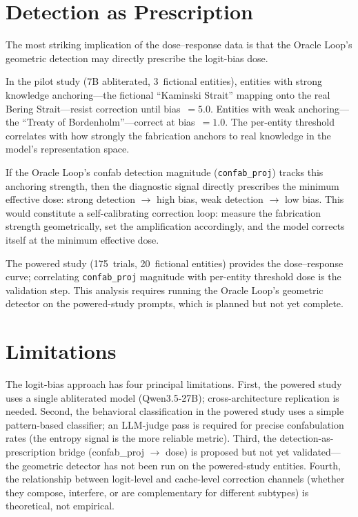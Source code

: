 \documentclass[11pt,a4paper]{article}
\begin{document}
\section{Detection as Prescription}
\label{sec:prescription}

The most striking implication of the dose--response data is that the Oracle
Loop's geometric detection may directly prescribe the logit-bias dose.

In the pilot study (7B abliterated, 3~fictional entities), entities with
strong knowledge anchoring---the fictional ``Kaminski Strait'' mapping onto the
real Bering Strait---resist correction until bias~$= 5.0$. Entities with weak
anchoring---the ``Treaty of Bordenholm''---correct at bias~$= 1.0$. The
per-entity threshold correlates with how strongly the fabrication anchors to
real knowledge in the model's representation space.

If the Oracle Loop's confab detection magnitude (\texttt{confab\_proj}) tracks
this anchoring strength, then the diagnostic signal directly prescribes the
minimum effective dose: strong detection $\to$ high bias, weak detection $\to$
low bias. This would constitute a self-calibrating correction loop: measure
the fabrication strength geometrically, set the amplification accordingly, and
the model corrects itself at the minimum effective dose.

The powered study (175~trials, 20~fictional entities) provides the
dose--response curve; correlating \texttt{confab\_proj} magnitude with
per-entity threshold dose is the validation step. This analysis requires
running the Oracle Loop's geometric detector on the powered-study prompts,
which is planned but not yet complete.

\section{Limitations}
\label{sec:limitations}

The logit-bias approach has four principal limitations. First, the powered
study uses a single abliterated model (Qwen3.5-27B); cross-architecture
replication is needed. Second, the behavioral classification in the powered
study uses a simple pattern-based classifier; an LLM-judge pass is required
for precise confabulation rates (the entropy signal is the more reliable
metric). Third, the detection-as-prescription bridge (confab\_proj $\to$ dose)
is proposed but not yet validated---the geometric detector has not been run on
the powered-study entities. Fourth, the relationship between logit-level and
cache-level correction channels (whether they compose, interfere, or are
complementary for different subtypes) is theoretical, not empirical.
\end{document}

